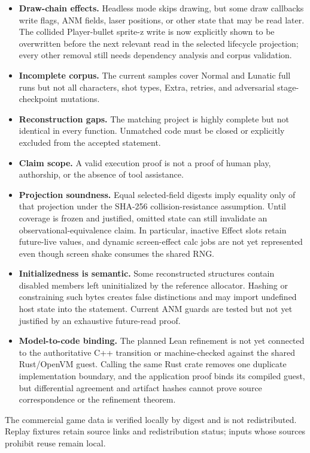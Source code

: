 \begin{itemize}
  none of those bindings.  The complete address-indexed semantics, code
  binding, and any fixed-point refinement have not yet been implemented or
  proved.
  \item \textbf{Draw-chain effects.}  Headless mode skips drawing, but some draw
  callbacks write flags, ANM fields, laser positions, or other state that may be
  read later.  The collided Player-bullet sprite-z write is now explicitly
  shown to be overwritten before the next relevant read in the selected
  lifecycle projection; every other removal still needs dependency analysis
  and corpus validation.
  \item \textbf{Incomplete corpus.}  The current samples cover Normal and
  Lunatic full runs but not all characters, shot types, Extra, retries, and
  adversarial stage-checkpoint mutations.
  \item \textbf{Reconstruction gaps.}  The matching project is highly complete
  but not identical in every function.  Unmatched code must be closed or
  explicitly excluded from the accepted statement.
  \item \textbf{Claim scope.}  A valid execution proof is not a proof of human
  play, authorship, or the absence of tool assistance.
  \item \textbf{Projection soundness.}  Equal selected-field digests imply
  equality only of that projection under the SHA-256 collision-resistance
  assumption.  Until coverage is frozen and justified, omitted state can still
  invalidate an observational-equivalence claim.  In particular, inactive
  Effect slots retain future-live values, and dynamic screen-effect calc jobs
  are not yet represented even though screen shake consumes the shared RNG.
  \item \textbf{Initializedness is semantic.}  Some reconstructed structures
  contain disabled members left uninitialized by the reference allocator.
  Hashing or constraining such bytes creates false distinctions and may import
  undefined host state into the statement.  Current ANM guards are tested but
  not yet justified by an exhaustive future-read proof.
  \item \textbf{Model-to-code binding.}  The planned Lean refinement is not yet
  connected to the authoritative C++ transition or machine-checked against the
  shared Rust/OpenVM guest.  Calling the same Rust crate removes one duplicate
  implementation boundary, and the application proof binds its compiled guest,
  but differential agreement and artifact hashes cannot prove source
  correspondence or the refinement theorem.
\end{itemize}

The commercial game data is verified locally by digest and is not
redistributed.  Replay fixtures retain source links and redistribution status;
inputs whose sources prohibit reuse remain local.
